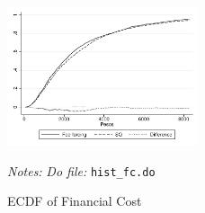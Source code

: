 \documentclass[11pt]{article}
\begin{document}
\begin{figure}[H]
        \caption{ECDF of Financial Cost}
    \label{ecdf_fc}
    \begin{center}
        \centering
        \includegraphics[width=0.5\textwidth]{Figuras/cdf_fc_pro_2.pdf}
    \end{center}
    \footnotesize \textit{Notes: } 
     \footnotesize{ \textit{Do file: }  \texttt{hist\_fc.do}}
\end{figure}
\end{document}
